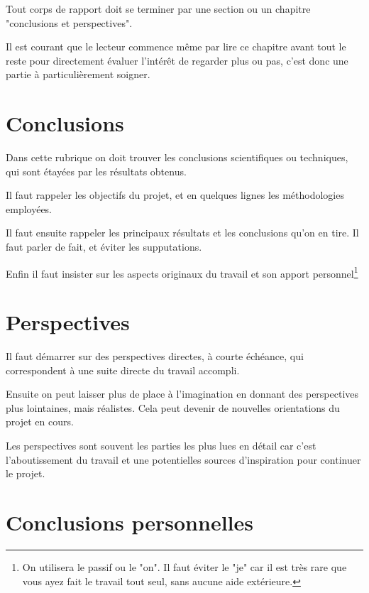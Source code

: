 


Tout corps de rapport doit se terminer par une section ou un chapitre "conclusions 
et perspectives". 

Il est courant que le lecteur commence même par lire ce chapitre avant tout le reste pour directement évaluer l'intérêt de regarder plus ou pas, c'est donc une partie à particulièrement soigner.

\section{Conclusions}

Dans cette rubrique on doit trouver les conclusions scientifiques ou techniques, qui sont étayées par les résultats obtenus. 

Il faut rappeler les objectifs du projet, et en quelques lignes les méthodologies employées. 

Il faut ensuite rappeler les principaux résultats et les conclusions qu'on en tire. Il faut parler de fait, et éviter les supputations.

Enfin il faut insister sur les aspects originaux du travail et son apport personnel\footnote{On utilisera le passif ou le "on". Il faut éviter le "je" car il est très rare que vous ayez fait le travail tout seul, sans aucune aide extérieure.}

\section{Perspectives}
 
Il faut démarrer sur des perspectives directes, à courte échéance, qui correspondent à une suite directe du travail accompli.

Ensuite on peut laisser plus de place à l'imagination en donnant des perspectives plus lointaines, mais réalistes. Cela peut devenir de nouvelles orientations du projet en cours.

Les perspectives sont souvent les parties les plus lues en détail car c'est l'aboutissement du travail et une potentielles sources d'inspiration pour continuer le projet.

\section{Conclusions personnelles}

